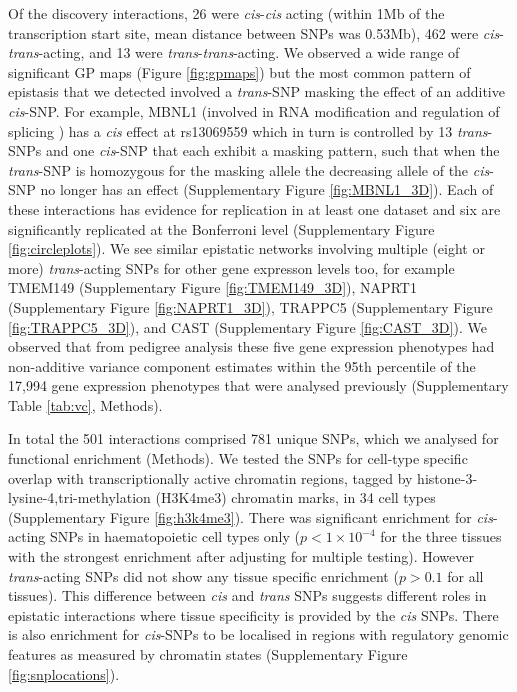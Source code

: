 \documentclass{article}
\begin{document}
Of the discovery interactions, 26 were \emph{cis}-\emph{cis} acting (within 1Mb of the transcription start site, mean distance between SNPs was 0.53Mb), 462 were \emph{cis}-\emph{trans}-acting, and 13 were \emph{trans}-\emph{trans}-acting. We observed a wide range of significant GP maps (Figure \ref{fig:gpmaps}) but the most common pattern of epistasis that we detected involved a \emph{trans}-SNP masking the effect of an additive \emph{cis}-SNP. For example, MBNL1 (involved in RNA modification and regulation of splicing \cite{Ho2004}) has a \emph{cis} effect at rs13069559 which in turn is controlled by 13 \emph{trans}-SNPs and one \emph{cis}-SNP that each exhibit a masking pattern, such that when the \emph{trans}-SNP is homozygous for the masking allele the decreasing allele of the \emph{cis}-SNP no longer has an effect (Supplementary Figure \ref{fig:MBNL1_3D}). Each of these interactions has evidence for replication in at least one dataset and six are significantly replicated at the Bonferroni level (Supplementary Figure \ref{fig:circleplots}). We see similar epistatic networks involving multiple (eight or more) \emph{trans}-acting SNPs for other gene expresson levels too, for example TMEM149 (Supplementary Figure \ref{fig:TMEM149_3D}), NAPRT1 (Supplementary Figure \ref{fig:NAPRT1_3D}), TRAPPC5 (Supplementary Figure \ref{fig:TRAPPC5_3D}), and CAST (Supplementary Figure \ref{fig:CAST_3D}). We observed that from pedigree analysis these five gene expression phenotypes had non-additive variance component estimates within the 95th percentile of the 17,994 gene expression phenotypes that were analysed previously \cite{Powell2013} (Supplementary Table \ref{tab:vc}, Methods).


In total the 501 interactions comprised 781 unique SNPs, which we analysed for functional enrichment (Methods). We tested the SNPs for cell-type specific overlap with transcriptionally active chromatin regions, tagged by histone-3-lysine-4,tri-methylation (H3K4me3) chromatin marks, in 34 cell types \cite{Trynka2013} (Supplementary Figure \ref{fig:h3k4me3}). There was significant enrichment for \emph{cis}-acting SNPs in haematopoietic cell types only ($p < 1 \times 10^{-4}$ for the three tissues with the strongest enrichment after adjusting for multiple testing). However \emph{trans}-acting SNPs did not show any tissue specific enrichment ($p > 0.1$ for all tissues). This difference between \emph{cis} and \emph{trans} SNPs suggests different roles in epistatic interactions where tissue specificity is provided by the \emph{cis} SNPs. There is also enrichment for \emph{cis}-SNPs to be localised in regions with regulatory genomic features as measured by chromatin states \cite{Hoffman2012} (Supplementary Figure \ref{fig:snplocations}).
\end{document}
